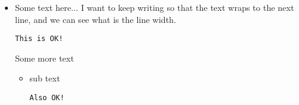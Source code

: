 \documentclass[]{article}
\begin{document}
	\begin{itemize}
		\item
		Some text here... I want to keep writing so that the text
		wraps to the next line, and we can see what is the line
		width.
		\begin{Verbatim}[gobble=\autogobble]
		This is OK!
		\end{Verbatim}
		Some more text
		\begin{itemize}
			\item
			sub text
			\begin{Verbatim}[gobble=\autogobble]
			Also OK!
			\end{Verbatim}
		\end{itemize}
	\end{itemize}
\end{document}
